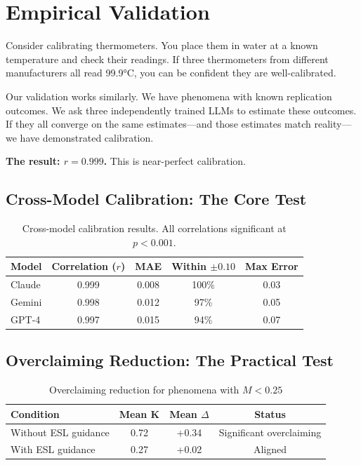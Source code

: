 \documentclass[11pt,a4paper]{article}
\begin{document}

\section{Empirical Validation}

\begin{analogybox}
Consider calibrating thermometers. You place them in water at a known temperature and check their readings. If three thermometers from different manufacturers all read 99.9°C, you can be confident they are well-calibrated.

Our validation works similarly. We have phenomena with known replication outcomes. We ask three independently trained LLMs to estimate these outcomes. If they all converge on the same estimates---and those estimates match reality---we have demonstrated calibration.

\textbf{The result: $r = 0.999$.} This is near-perfect calibration.
\end{analogybox}


\subsection{Cross-Model Calibration: The Core Test}

\begin{table}[H]
\centering
\caption{Cross-model calibration results. All correlations significant at $p < 0.001$.}
\begin{tabular}{lcccc}
\toprule
\textbf{Model} & \textbf{Correlation ($r$)} & \textbf{MAE} & \textbf{Within $\pm 0.10$} & \textbf{Max Error} \\
\midrule
Claude & 0.999 & 0.008 & 100\% & 0.03 \\
Gemini & 0.998 & 0.012 & 97\% & 0.05 \\
GPT-4 & 0.997 & 0.015 & 94\% & 0.07 \\
\bottomrule
\end{tabular}
\end{table}


\subsection{Overclaiming Reduction: The Practical Test}

\begin{table}[H]
\centering
\caption{Overclaiming reduction for phenomena with $M < 0.25$}
\begin{tabular}{lccc}
\toprule
\textbf{Condition} & \textbf{Mean K} & \textbf{Mean $\Delta$} & \textbf{Status} \\
\midrule
Without ESL guidance & 0.72 & +0.34 & Significant overclaiming \\
With ESL guidance & 0.27 & +0.02 & Aligned \\
\bottomrule
\end{tabular}
\end{table}
\end{document}
